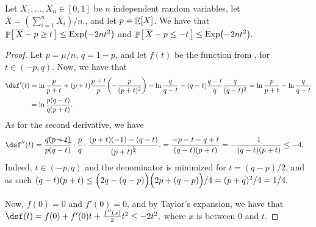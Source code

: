 \begin{theorem}
    Let $X_1, \ldots, X_n \in [0,1]$ be $n$ independent random
    variables, let $\overline{X} = (\sum_{i=1}^n X_i)/n\bigl.$, and
    let $p = \mathop{\mathbb{E}}\!\left[ {X} \right]$. We have that
    \begin{math}%
        \ds%
        \Prob{\bigl.\,\overline{X} - p \geq t\, }%
        \leq%
        \Exp\pth{ -2 n t^2}
    \end{math}
    and 
    \begin{math}%
        \ds%
        \Prob{\bigl.\, \overline{X} - p \leq -t \, }%
        \leq%
        \Exp\pth{ -2 n t^2}.
    \end{math}
\end{theorem}
\begin{proof}
    Let $p = \mu/n$, $q =1-p$, and let $f(t)$ be the function from
    , for $t \in (-p,q)$. Now, we have that
    \begin{align*}
        \ds%
        f'(t)%
        &=%
        \ln \frac{p}{p+t}%
        + (p+t) \frac{p+t}{p} \pth{-\frac{p}{(p+t)^2}}%
        - \ln \frac{q}{q-t}%
        - (q-t)\frac{q-t}{q}\frac{q}{(q-t)^2}%
        =%
        \ln \frac{p}{p+t} - \ln \frac{q}{q-t}%
        \\&%
        =%
        \ln \frac{p(q-t)}{q(p+t)}. %
    \end{align*}
    As for the second derivative, we have
    \begin{align*}
        \ds%
        f''(t)%
        &=%
        \frac{q\bcancel{(p+t)}}{p(q-t)} %
        \cdot \frac{p}{q} \cdot%
        \frac{(p+t)(-1) - (q-t) } {(p+t)^{\bcancel{2}}}. %
        =%
        \frac{-p-t - q+t } {(q-t)(p+t)} %
        =%
        - \frac{1 } {(q-t)(p+t)} %
        \leq%
        -4.
    \end{align*}
    Indeed, $t\in (-p,q)$ and the denominator is minimized for
    $t = (q-p)/2$, and as such
    \begin{math} 
        (q-t)(p+t)%
        \leq%
        \pth{\Bigl.2q -(q- p)} \pth{\Bigl. 2p +(q -p)}/4 =%
        (p+q)^2/4 = 1/4.
    \end{math}

    Now, $f(0) =0$ and $f'(0) = 0$, and by Taylor's expansion, we have
    that 
    \begin{math}
        \ds%
        f(t) = f(0) + f'(0)t + \frac{f''(x)}{2} t^2 \leq -2 t^2,
    \end{math}
    where $x$ is between $0$ and $t$.


\end{proof}
